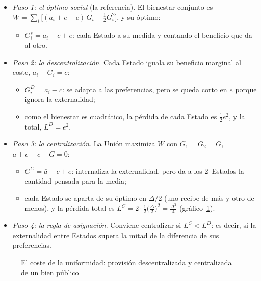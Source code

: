 \documentclass[11pt]{article}
\begin{document}
\begin{itemize}
\item \emph{Paso 1: el óptimo social} (la referencia). El bienestar conjunto es $W=\sum_i\big[(a_i+e-c)\,G_i-\tfrac12G_i^2\big]$, y su óptimo:
  \begin{itemize}
  \item $G_i^{s}=a_i-c+e$: cada Estado a su medida y contando el beneficio que da al otro.
  \end{itemize}
\item \emph{Paso 2: la descentralización}. Cada Estado iguala su beneficio marginal al coste, $a_i-G_i=c$:
  \begin{itemize}
  \item $G_i^{D}=a_i-c$: se adapta a las preferencias, pero se queda corto en $e$ porque ignora la externalidad;
  \item como el bienestar es cuadrático, la pérdida de cada Estado es $\tfrac12e^2$, y la total, $L^{D}=e^2$.
  \end{itemize}
\item \emph{Paso 3: la centralización}. La Unión maximiza $W$ con $G_1=G_2=G$, $\bar a+e-c-G=0$:
  \begin{itemize}
  \item $G^{C}=\bar a-c+e$: internaliza la externalidad, pero da a los 2~Estados la cantidad pensada para la media;
  \item cada Estado se aparta de su óptimo en $\Delta/2$ (uno recibe de más y otro de menos), y la pérdida total es $L^{C}=2\cdot\tfrac12\big(\tfrac{\Delta}{2}\big)^2=\tfrac{\Delta^2}{4}$ (gráfico~\ref{fig:oates}).
  \end{itemize}
\item \emph{Paso 4: la regla de asignación}. Conviene centralizar si $L^{C}<L^{D}$:
  es decir, si la externalidad entre Estados supera la mitad de la diferencia de sus preferencias.
\end{itemize}

\begin{figure}[H]
\centering
\caption{El coste de la uniformidad: provisión descentralizada y centralizada de un bien público}\label{fig:oates}
\end{figure}
\end{document}

